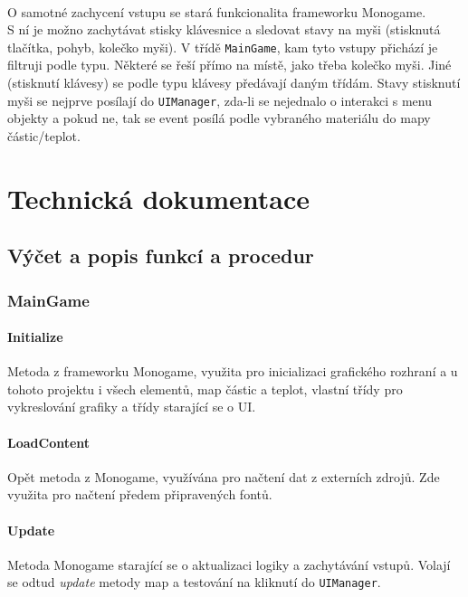 \documentclass[a4paper, 12pt]{article}
\begin{document}
\paragraph{} 
O samotné zachycení vstupu se stará funkcionalita frameworku Monogame. \\S ní je
možno zachytávat stisky klávesnice a sledovat stavy na myši (stisknutá
tlačítka, pohyb, kolečko myši). V třídě \texttt{MainGame}, kam tyto vstupy
přichází je filtruji podle typu. Některé se řeší přímo na místě, jako třeba
kolečko myši. Jiné (stisknutí klávesy) se podle typu klávesy předávají daným
třídám. Stavy stisknutí myši se nejprve posílají do \texttt{UIManager}, zda-li
se nejednalo o interakci s menu objekty a pokud ne, tak se event posílá podle
vybraného materiálu do mapy částic/teplot.

\section{Technická dokumentace}
\subsection{Výčet a popis funkcí a procedur}

\subsubsection{MainGame}
\paragraph{Initialize}
Metoda z frameworku Monogame, využita pro inicializaci grafického rozhraní a u
tohoto projektu i všech elementů, map částic a teplot, vlastní třídy pro vykreslování
grafiky a třídy starající se o UI.

\paragraph{LoadContent}
Opět metoda z Monogame, využívána pro načtení dat z externích zdrojů. Zde
využita pro načtení předem připravených fontů.

\paragraph{Update}
Metoda Monogame starající se o aktualizaci logiky a zachytávání vstupů. Volají
se odtud \emph{update} metody map a testování na kliknutí do
\texttt{UIManager}.
\end{document}
